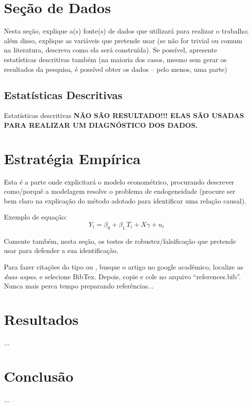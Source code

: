 \documentclass[letterpaper,12pt]{article}
\begin{document}
\section{Seção de Dados}\label{data}

Nesta seção, explique a(s) fonte(s) de dados que utilizará para realizar o trabalho; além disso, explique as variáveis que pretende usar (se não for trivial ou comum na literatura, descreva como ela será construída). Se possível, apresente estatísticas descritivas também (na maioria dos casos, mesmo sem gerar os resultados da pesquisa, é possível obter os dados -- pelo menos, uma parte)


\subsection{Estatísticas Descritivas} \label{desc}

Estatísticas descritivas \textbf{NÃO SÃO RESULTADO!!! ELAS SÃO USADAS PARA REALIZAR UM DIAGNÓSTICO DOS DADOS.}

\section{Estratégia Empírica} \label{method}


Esta é a parte onde explicitará o modelo econométrico, procurando descrever como/porquê a modelagem resolve o problema de endogeneidade (procure ser bem claro na explicação do método adotado para identificar uma relação causal).

Exemplo de equação:
\begin{equation}
    Y_{i} = \beta_{0} + \beta_{1} \, T_{i} + X\gamma + u_{i} \label{eq03}
\end{equation}

Comente também, nesta seção, os testes de robustez/falsificação que pretende usar para defender a sua identificação.

Para fazer citações do tipo \citet{angrist2008mostly} ou \citep{angrist2008mostly}, busque o artigo no google acadêmico, localize as \textit{duas aspas}, e selecione BibTex. Depois, copie e cole no arquivo ``references.bib''. Nunca mais perca tempo preparando referências...

\section{Resultados}\label{results}

...

\section{Conclusão}\label{conclusion}

...



\bigskip

\singlespacing



%
%

%
\end{document}
